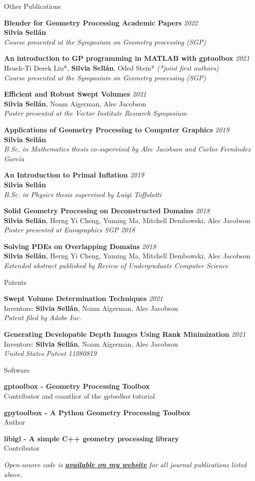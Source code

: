\documentclass{resume}
\newcommand{\software}[2]{
    {\bf #1}\\ 
    {\small#2 }}
\newcommand{\publication}[5]{
    {\bf #1} \hfill {\em \small #2} \\ %
    {\small#3}{\small \bf Silvia Sell\'{a}n}{\small #4} \\ %
    {\small \it #5} %
}
\newcommand{\patent}[5]{
    {\bf #1} \hfill {\em \small #2} \\ %
    {\small Inventors: #3}{\small \bf Silvia Sell\'{a}n}{\small #4} \\ %
    {\small \it #5} %
}
\begin{document}
\begin{rSection}{Other Publications}

\publication{Blender for Geometry Processing Academic Papers}{2022}{}{}{Course presented at the Symposium on Geometry processing (SGP)}

\publication{An introduction to GP programming in MATLAB with gptoolbox}{2021}{ 
Hsueh-Ti Derek Liu*, }{*, Oded Stein* \textit{(*joint first authors)}}{Course presented at the Symposium on Geometry processing (SGP)}

\publication{Efficient and Robust Swept Volumes}{2021}{}{, Noam Aigerman, Alec Jacobson}{Poster presented at the Vector Institute Research Symposium}

\publication{Applications of Geometry Processing to Computer Graphics}{2019}{}{}{B.Sc. in Mathematics thesis co-supervised by Alec Jacobson and Carlos Fernández García}

\publication{An Introduction to Primal Inflation}{2019}{}{}{B.Sc. in Physics thesis supervised by Luigi Toffolatti}

\publication{Solid Geometry Processing on Deconstructed Domains}{2018}{}{, Herng Yi Cheng, Yuming Ma, Mitchell Dembowski, Alec Jacobson}
{Poster presented at Eurographics SGP 2018}

\publication{Solving PDEs on Overlapping Domains}{2018}{}{, Herng Yi Cheng, Yuming Ma, Mitchell Dembowski, Alec Jacobson}{Extended abstract published by Review of Undergraduate Computer Science}

\end{rSection}

\begin{rSection}{Patents}

\patent{Swept Volume Determination Techniques}{2021}{}{, Noam Aigerman, Alec Jacobson}{Patent filed by Adobe Inc.}

\patent{Generating Developable Depth Images Using Rank Minimization}{2021}{}{, Noam Aigerman, Alec Jacobson}{United States Patent 11080819}

\end{rSection}

\begin{rSection}{Software}

\software{gptoolbox - Geometry Processing Toolbox}{Contributor and coauthor of the \textit{gptoolbox} tutorial}

\software{gpytoolbox - A Python Geometry Processing Toolbox}{Author}

\software{libigl - A simple C++ geometry processing library}{Contributor}


\textit{Open-source code is \href{http://dgp.toronto.edu/~sgsellan/}{\textbf{available on my website}} for all journal publications listed above.}

\end{rSection}
\end{document}
